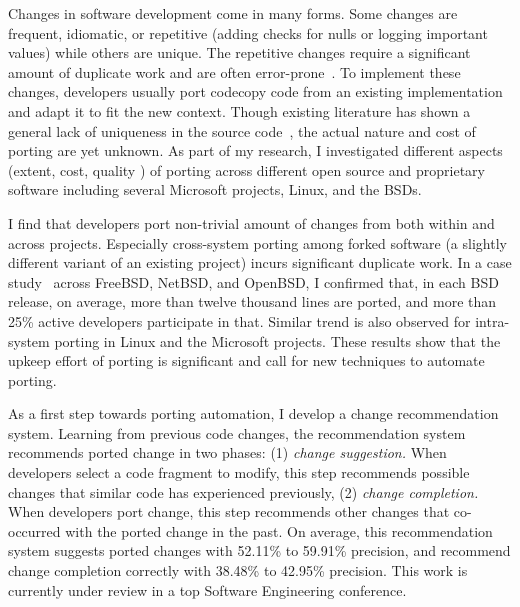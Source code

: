 \documentclass[a4paper, 11pt]{article}
\begin{document}
\begin{small}
Changes in software development come in many forms. Some changes are frequent, idiomatic, or
repetitive (\eg adding checks for nulls or logging important values) while others are unique.
The repetitive changes require a significant amount of duplicate work and are often
error-prone~\cite{}.  To implement these changes, developers usually port code\textemdash copy
code from an existing implementation and adapt it to fit the new context. Though existing
literature has shown a general lack of uniqueness in the source code~\cite{}, the actual nature
and cost of porting are yet unknown. As part of my research, I investigated different aspects
(\eg extent, cost, quality \etc) of porting across different open source and proprietary
software including several Microsoft projects, Linux, and the BSDs. 

I find that developers port non-trivial amount of changes from both within and across projects.
Especially cross-system porting among forked software (a slightly different variant of an
existing project) incurs significant duplicate work. In a case study~\cite{Ray2012} across
FreeBSD, NetBSD, and OpenBSD, I confirmed that, in each BSD release, on average, more than
twelve thousand lines are ported, and more than 25\% active developers participate in that.
Similar trend is also observed for intra-system porting in Linux and the Microsoft projects.
These results show that the upkeep effort of porting is significant and call for new techniques
to automate porting.

As a first step towards porting automation, I develop a change recommendation system.  Learning
from previous code changes, the recommendation system recommends ported change in two phases:
(1) {\em change suggestion.} When developers select a code fragment to modify, this step
recommends possible changes that similar code has experienced previously, (2) {\em change
completion.} When developers port change, this step recommends other changes that co-occurred
with the ported change in the past. On average, this recommendation system suggests ported
changes with 52.11\% to 59.91\% precision, and recommend change completion correctly with
38.48\% to 42.95\% precision. This work is currently under review in a top Software Engineering
conference. 


\end{small}
\end{document}
